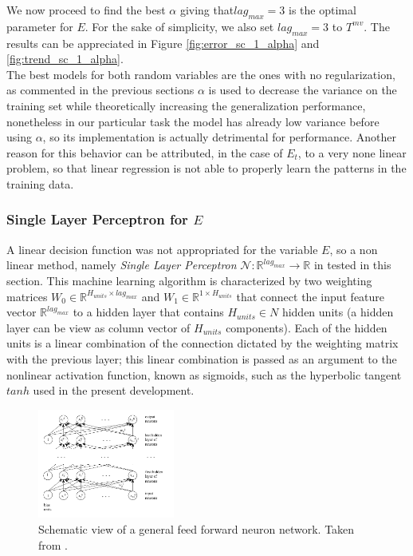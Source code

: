 We now proceed to find the best $\alpha$ giving that$lag_{max}=3$ is the optimal parameter for $E$. For the sake of simplicity, we also set $lag_{max}=3$ to $T^{mv}$. The results can be appreciated in Figure \ref{fig:error_sc_1_alpha} and \ref{fig:trend_sc_1_alpha}.\\ 

The best models for both random variables are the ones with no regularization, as commented in the previous sections $\alpha$ is used to decrease the variance on the training set while theoretically increasing the generalization performance, nonetheless in our particular task the model has already low variance before using $\alpha$, so its implementation is actually detrimental for performance. Another reason for this behavior can be attributed, in the case of $E_{t}$, to a very none linear problem, so that linear regression is not able to properly learn the patterns in the training data. \\



\subsubsection{Single Layer Perceptron for $E$}

A linear decision function was not appropriated for the variable $E$, so a non linear method, namely \emph{Single Layer Perceptron}  $\mathcal{N}:\mathbb{R}^{lag_{max}} \rightarrow \mathbb{R}$ in tested in this section. This machine learning algorithm is characterized by two weighting matrices $W_{0} \in \mathbb{R}^{H_{units}\times lag_{max}} $ and $W_{1} \in \mathbb{R}^{1 \times H_{units}}$ that connect the input feature vector $\mathbb{R}^{lag_{max}}$ to a hidden layer that contains $H_{units} \in N$ hidden units (a hidden layer can be view as column vector of $H_{units}$ components). Each of the hidden units is a linear combination of the connection dictated by the weighting matrix with the previous layer; this linear combination is passed as an argument to the nonlinear activation function, known as sigmoids, such as the hyperbolic tangent $tanh$ used in the present development. 

\begin{figure}[htpb!] %
	\centering %
	\includegraphics[width=0.4\textwidth]{notebooks/data/nn.png} %
	\caption{Schematic view of a general feed forward neuron network. Taken from  \cite{ml_jacobs_h}.} %
	\label{fig:nn} %
\end{figure}


